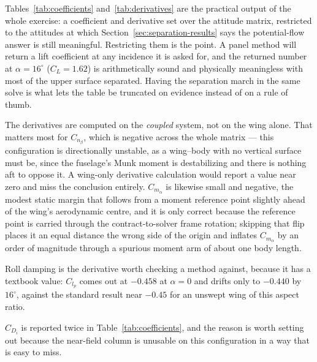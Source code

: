 \documentclass[submit]{aiaa-tc}%
\begin{document}
\begin{table}[tb]
  \centering
  \caption{Stability derivatives at $\beta = 0$ over the attached
    attitudes, computed by central differences on the coupled
    wing--body--duct system. Angle derivatives are per radian; rate
    derivatives are per unit reduced rate ($q\bar{c}/2V$, $pb/2V$,
    $rb/2V$).}
  \label{tab:derivatives}
  
\end{table}

Tables~\ref{tab:coefficients} and~\ref{tab:derivatives} are the practical
output of the whole exercise: a coefficient and derivative set over the
attitude matrix, restricted to the attitudes at which
Section~\ref{sec:separation-results} says the potential-flow answer is
still meaningful. Restricting them is the point. A panel method will
return a lift coefficient at any incidence it is asked for, and the
returned number at $\alpha = 16^\circ$ ($C_L = 1.62$) is arithmetically
sound and physically meaningless with most of the upper surface
separated. Having the separation march in the same solve is what lets the
table be truncated on evidence instead of on a rule of thumb.

The derivatives are computed on the \emph{coupled} system, not on the wing
alone. That matters most for $C_{n_\beta}$, which is negative across the
whole matrix --- this configuration is directionally unstable, as a
wing--body with no vertical surface must be, since the fuselage's Munk
moment is destabilizing and there is nothing aft to oppose it. A
wing-only derivative calculation would report a value near zero and miss
the conclusion entirely. $C_{m_\alpha}$ is likewise small and negative,
the modest static margin that follows from a moment reference point
slightly ahead of the wing's aerodynamic centre, and it is only correct
because the reference point is carried through the contract-to-solver
frame rotation; skipping that flip places it an equal distance the wrong
side of the origin and inflates $C_{m_\alpha}$ by an order of magnitude
through a spurious moment arm of about one body length.

Roll damping is the derivative worth checking a method against, because
it has a textbook value: $C_{l_p}$ comes out at $-0.458$ at $\alpha = 0$
and drifts only to $-0.440$ by $16^\circ$, against the standard result
near $-0.45$ for an unswept wing of this aspect ratio.

$C_{D_i}$ is reported twice in Table~\ref{tab:coefficients}, and the
reason is worth setting out because the near-field column is unusable on
this configuration in a way that is easy to miss.
\end{document}
